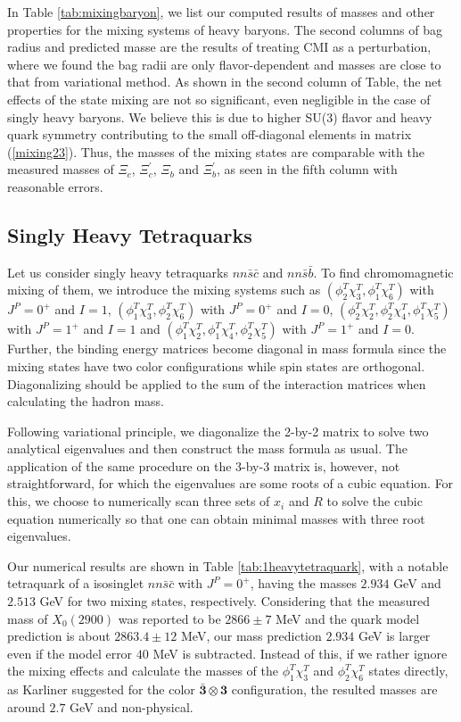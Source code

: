 \documentclass[prd,twocolumn,floatfix,nofootinbib]{revtex4}
\begin{document}
In Table \ref{tab:mixingbaryon}, we list our computed results of masses and other properties for the mixing systems of heavy baryons. 
The second columns of bag radius and predicted masse are the results of treating CMI as a perturbation, where we found the bag radii are only flavor-dependent and masses are close to that from variational method.
As shown in the second column of Table, the net effects of the state mixing are not so significant, even negligible in the case of singly heavy baryons. 
We believe this is due to higher SU(3) flavor and heavy quark symmetry contributing to the small off-diagonal elements in matrix (\ref{mixing23}). 
Thus, the masses of the mixing states are comparable with the measured masses of $\Xi_{c}$, $\Xi_{c}^{\prime}$, $\Xi_{b}$ and $\Xi_{b}^{\prime}$, as seen in the fifth column with reasonable errors.


\subsection{Singly Heavy Tetraquarks}
Let us consider singly heavy tetraquarks $nn\bar{s}\bar{c}$ and $nn\bar{s}\bar{b}$. To find chromomagnetic mixing of them, we introduce the mixing systems such as
$(\phi_{2}^{T}\chi_{3}^{T},\phi_{1}^{T}\chi_{6}^{T})$ with $J^{P}=0^{+}$ and $I=1$,
$(\phi_{1}^{T}\chi_{3}^{T},\phi_{2}^{T}\chi_{6}^{T})$ with $J^{P}=0^{+}$ and $I=0$,
$(\phi_{2}^{T}\chi_{2}^{T},\phi_{2}^{T}\chi_{4}^{T},\phi_{1}^{T}\chi_{5}^{T})$ with $J^{P}=1^{+}$ and $I=1$ and
$(\phi_{1}^{T}\chi_{2}^{T},\phi_{1}^{T}\chi_{4}^{T},\phi_{2}^{T}\chi_{5}^{T})$ with $J^{P}=1^{+}$ and $I=0$.
Further, the binding energy matrices become diagonal in mass formula since the mixing states have two color configurations while spin states are orthogonal. 
Diagonalizing should be applied to the sum of the interaction matrices when calculating the hadron mass.

Following variational principle, we diagonalize the 2-by-2 matrix to solve two analytical eigenvalues and then construct the mass formula as usual.
The application of the same procedure on the 3-by-3 matrix is, however, not straightforward, for which the eigenvalues are some roots of a cubic equation.
For this, we choose to numerically scan three sets of $x_{i}$ and $R$ to solve the cubic equation numerically so that one can obtain minimal masses with three root eigenvalues.

Our numerical results are shown in Table \ref{tab:1heavytetraquark}, with a notable tetraquark of a isosinglet $nn\bar{s}\bar{c}$ with $J^{P}=0^{+}$, having the masses $2.934$ GeV and $2.513$ GeV for two mixing states, respectively.
Considering that the measured mass of $X_{0}(2900)$ was reported to be $2866\pm 7$ MeV \cite{LHCb:2020kd} and the quark model prediction is about $2863.4\pm 12$ MeV\cite{Karliner:2020vsi}, our mass prediction $2.934$ GeV is larger even if the model error $40$ MeV is subtracted. 
Instead of this, if we rather ignore the mixing effects and calculate the masses of the $\phi_{1}^{T}\chi_{3}^{T}$ and $\phi_{2}^{T}\chi_{6}^{T}$ states directly, as Karliner suggested for the color $\boldsymbol{\bar{3}}\otimes\boldsymbol{3}$ configuration, the resulted masses are around $2.7$ GeV and non-physical. 
\end{document}
